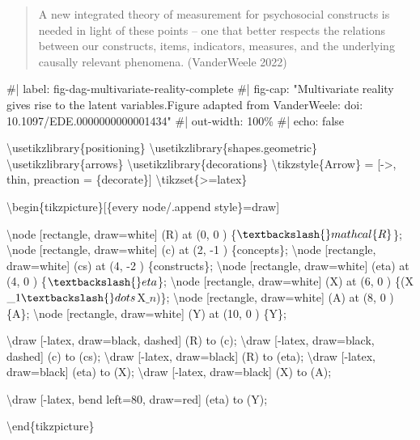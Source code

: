 \documentclass[
  letterpaper,
  DIV=11,
  numbers=noendperiod]{scrartcl}
\newenvironment{Shaded}{\begin{snugshade}}{\end{snugshade}}
\newcommand{\NormalTok}[1]{\textcolor[rgb]{0.00,0.23,0.31}{#1}}
\begin{document}
\begin{quote}
A new integrated theory of measurement for psychosocial constructs is
needed in light of these points -- one that better respects the
relations between our constructs, items, indicators, measures, and the
underlying causally relevant phenomena. (VanderWeele 2022)
\end{quote}

\begin{Shaded}
\begin{Highlighting}[]
\NormalTok{\#| label: fig{-}dag{-}multivariate{-}reality{-}complete}
\NormalTok{\#| fig{-}cap: "Multivariate reality gives rise to the latent variables.Figure adapted from VanderWeele: doi: 10.1097/EDE.0000000000001434"}
\NormalTok{\#| out{-}width: 100\%}
\NormalTok{\#| echo: false}

\NormalTok{\textbackslash{}usetikzlibrary\{positioning\}}
\NormalTok{\textbackslash{}usetikzlibrary\{shapes.geometric\}}
\NormalTok{\textbackslash{}usetikzlibrary\{arrows\}}
\NormalTok{\textbackslash{}usetikzlibrary\{decorations\}}
\NormalTok{\textbackslash{}tikzstyle\{Arrow\} = [{-}\textgreater{}, thin, preaction = \{decorate\}]}
\NormalTok{\textbackslash{}tikzset\{\textgreater{}=latex\}}

\NormalTok{\textbackslash{}begin\{tikzpicture\}[\{every node/.append style\}=draw]}


\NormalTok{\textbackslash{}node [rectangle, draw=white] (R) at (0, 0 ) \{$\textbackslash{}mathcal\{R\}$\};}
\NormalTok{\textbackslash{}node [rectangle, draw=white] (c) at (2, {-}1 ) \{concepts\};}
\NormalTok{\textbackslash{}node [rectangle, draw=white] (cs) at (4, {-}2 ) \{constructs\};}
\NormalTok{\textbackslash{}node [rectangle, draw=white] (eta) at (4, 0 ) \{$\textbackslash{}eta$\};}
\NormalTok{\textbackslash{}node [rectangle, draw=white] (X) at (6, 0 ) \{(X$\_1 \textbackslash{}dots$X$\_n$)\};}
\NormalTok{\textbackslash{}node [rectangle, draw=white] (A) at (8, 0 ) \{A\};}
\NormalTok{\textbackslash{}node [rectangle, draw=white] (Y) at (10, 0 ) \{Y\};}



\NormalTok{\textbackslash{}draw [{-}latex, draw=black, dashed] (R) to (c);}
\NormalTok{\textbackslash{}draw [{-}latex, draw=black, dashed] (c) to (cs);}
\NormalTok{\textbackslash{}draw [{-}latex, draw=black] (R) to (eta);}
\NormalTok{\textbackslash{}draw [{-}latex, draw=black] (eta) to (X);}
\NormalTok{\textbackslash{}draw [{-}latex, draw=black] (X) to (A);}



\NormalTok{\textbackslash{}draw [{-}latex, bend left=80, draw=red] (eta) to (Y);}


\NormalTok{\textbackslash{}end\{tikzpicture\}}
\end{Highlighting}
\end{Shaded}
\end{document}
